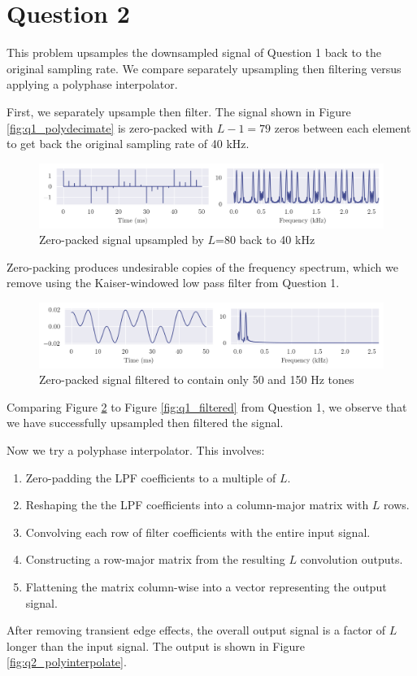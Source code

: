 \section*{Question 2}

This problem upsamples the downsampled signal of Question 1 back to the original sampling rate. We compare separately upsampling then filtering versus applying a polyphase interpolator.

First, we separately upsample then filter. The signal shown in Figure \ref{fig:q1_polydecimate} is zero-packed with $L-1=79$ zeros between each element to get back the original sampling rate of 40 kHz.

\begin{figure}[ht]
    \centering
    \includegraphics[width=\textwidth]{images/q2_zpack.png}
    \caption{Zero-packed signal upsampled by $L$=80 back to 40 kHz}
    \label{fig:q2_zpack}
\end{figure}

Zero-packing produces undesirable copies of the frequency spectrum, which we remove using the Kaiser-windowed low pass filter from Question 1.

\begin{figure}[ht]
    \centering
    \includegraphics[width=\textwidth]{images/q2_usamp.png}
    \caption{Zero-packed signal filtered to contain only 50 and 150 Hz tones}
    \label{fig:q2_usamp}
\end{figure}

Comparing Figure \ref{fig:q2_usamp} to Figure \ref{fig:q1_filtered} from Question 1, we observe that we have successfully upsampled then filtered the signal.

Now we try a polyphase interpolator. This involves:
\begin{enumerate}
    \item Zero-padding the LPF coefficients to a multiple of $L$.
    \item Reshaping the the LPF coefficients into a column-major matrix with $L$ rows.
    \item Convolving each row of filter coefficients with the entire input signal.
    \item Constructing a row-major matrix from the resulting $L$ convolution outputs.
    \item Flattening the matrix column-wise into a vector representing the output signal.
\end{enumerate}
After removing transient edge effects, the overall output signal is a factor of $L$ longer than the input signal. The output is shown in Figure \ref{fig:q2_polyinterpolate}.


